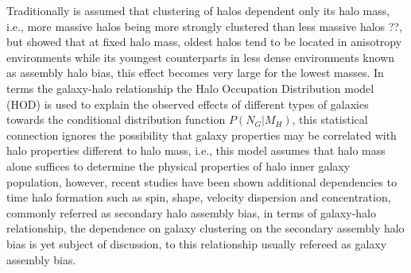 \documentclass[fleqn,usenatbib]{mnras}
\begin{document}
Traditionally is assumed that clustering of halos dependent only its
halo mass, i.e., more massive halos being more strongly clustered than
less massive halos \citep{1984ApJ...284L...9K}??, but
\citet{2005MNRAS.363L..66G} showed that at fixed halo mass, oldest
halos tend to be located in anisotropy environments while its youngest
counterparts in less dense environments known as assembly halo bias,
this effect becomes very large for the lowest masses.  
In terms the galaxy-halo relationship the Halo Occupation Distribution
model (HOD) is used to explain the observed effects of different types
of galaxies towards the conditional distribution function
$P(N_G|M_H)$, this statistical connection ignores the possibility that
galaxy properties may be correlated with halo properties different to
halo mass, i.e., this model assumes that halo mass alone suffices to
determine the physical properties of halo inner galaxy population,
however, recent studies have been shown additional dependencies to
time halo formation such as spin, shape, velocity dispersion and
concentration, commonly referred as secondary halo assembly bias, in
terms of galaxy-halo relationship, the dependence on galaxy clustering
on the secondary assembly halo bias is yet subject of discussion, to
this relationship usually refereed as galaxy assembly bias. 
\end{document}
